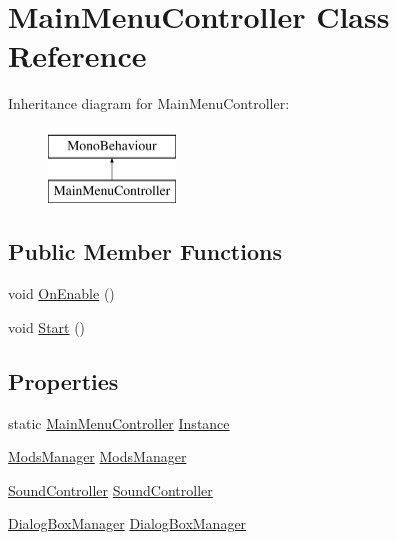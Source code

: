 \hypertarget{class_main_menu_controller}{}\section{Main\+Menu\+Controller Class Reference}
\label{class_main_menu_controller}
Inheritance diagram for Main\+Menu\+Controller\+:\begin{figure}[H]
\begin{center}
\leavevmode
\includegraphics[height=2.000000cm]{class_main_menu_controller}
\end{center}
\end{figure}
\subsection*{Public Member Functions}
\begin{DoxyCompactItemize}
\item 
void \hyperlink{class_main_menu_controller_a7f6484c31265c993842c1a32b1ac9857}{On\+Enable} ()
\item 
void \hyperlink{class_main_menu_controller_a732c505767ad16e6f4726f0e9643fa8a}{Start} ()
\end{DoxyCompactItemize}
\subsection*{Properties}
\begin{DoxyCompactItemize}
\item 
static \hyperlink{class_main_menu_controller}{Main\+Menu\+Controller} \hyperlink{class_main_menu_controller_a7b6358d43170c3d411ddaf576d05f07c}{Instance}
\item 
\hyperlink{class_mods_manager}{Mods\+Manager} \hyperlink{class_main_menu_controller_a198373b352f30222a69f3800aee5ecb4}{Mods\+Manager}
\item 
\hyperlink{class_sound_controller}{Sound\+Controller} \hyperlink{class_main_menu_controller_aeac50ca4260bbf323dec37433c10d9e4}{Sound\+Controller}
\item 
\hyperlink{class_dialog_box_manager}{Dialog\+Box\+Manager} \hyperlink{class_main_menu_controller_a8c41d12d3444f11c92c93f9b2246f6ac}{Dialog\+Box\+Manager}
\end{DoxyCompactItemize}


